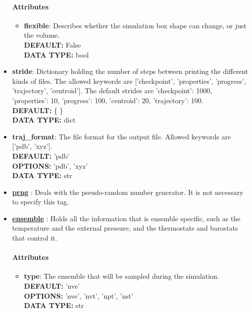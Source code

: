 \begin{itemize}
\paragraph{Attributes}
 \begin{itemize}
\item {\bf flexible}:
 Describes whether the simulation box shape can change, or just the volume.
{\\ \bf DEFAULT: }False
{\\ \bf DATA TYPE: }bool
\end{itemize}
 
\item {\bf stride}:
 Dictionary holding the number of steps between printing the different kinds of files. The allowed keywords are ['checkpoint', 'properties', 'progress', 'trajectory', 'centroid']. The default strides are {'checkpoint': 1000, 'properties': 10, 'progress': 100, 'centroid': 20, 'trajectory': 100}.
{\\ \bf DEFAULT: }\{ \}
{\\ \bf DATA TYPE: }dict
\item {\bf traj\_format}:
 The file format for the output file. Allowed keywords are ['pdb', 'xyz'].
{\\ \bf DEFAULT: }'pdb'
{\\ \bf OPTIONS: }'pdb', 'xyz'
{\\ \bf DATA TYPE: }str
\item {\bf \hyperref[RANDOM]{prng} }:
 Deals with the pseudo-random number generator. It is not necessary to specify this tag.
\item {\bf \hyperref[ENSEMBLE]{ensemble} }:
 Holds all the information that is ensemble specific, such as the temperature and the external pressure, and the thermostats and barostats that control it.
\paragraph{Attributes}
 \begin{itemize}
\item {\bf type}:
 The ensemble that will be sampled during the simulation.
{\\ \bf DEFAULT: }'nve'
{\\ \bf OPTIONS: }'nve', 'nvt', 'npt', 'nst'
{\\ \bf DATA TYPE: }str
\end{itemize}
 
\end{itemize}
 

